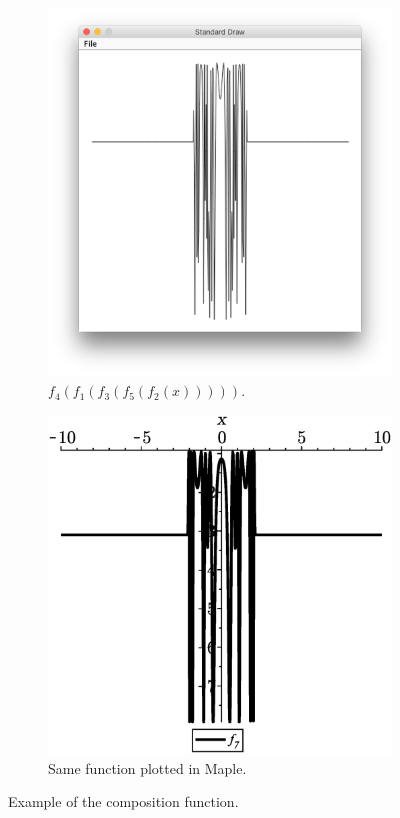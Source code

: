 \begin{figure}[H]
    \begin{subfigure}{0.5\textwidth}
        \centering
        \includegraphics[width=0.7\linewidth]{GraphicalFunctionPlotter/fig/f7.png} 
        \caption{$f_4(f_1(f_3(f_5(f_2(x)))))$.}
        \label{fig:f7}
    \end{subfigure}
    \begin{subfigure}{0.5\textwidth}
        \centering
        \includegraphics[width=0.7\linewidth]{GraphicalFunctionPlotter/fig/f7Check.eps}
        \caption{Same function plotted in Maple.}
        \label{fig:f7Check}
    \end{subfigure}
    \caption{Example of the composition function.}
\end{figure}


